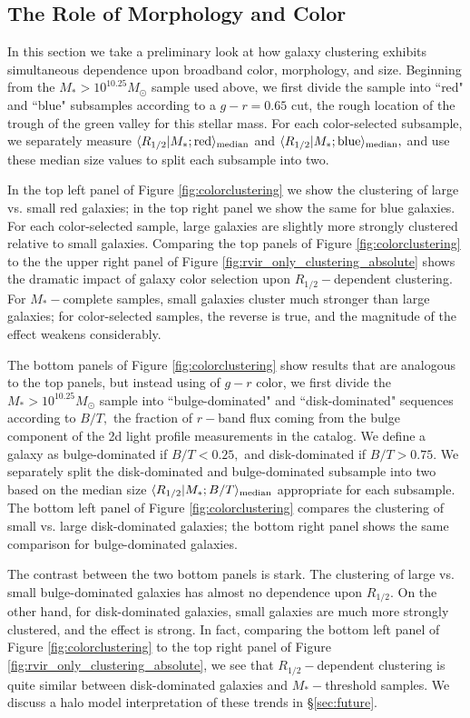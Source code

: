 \documentclass[usenatbib,usegraphicx,letterpaper]{mn2e}
\newcommand{\rhalf}{R_{1/2}}
\newcommand{\mstar}{M_{\ast}}
\newcommand{\median}[2]{\langle{#1}\vert{#2}\rangle_{\rm median}}
\newcommand{\msun}{M_\odot}
\begin{document}
\subsection{The Role of Morphology and Color}
\label{subsec:colormorph}

In this section we take a preliminary look at how galaxy clustering exhibits simultaneous dependence upon broadband color, morphology, and size. Beginning from the $\mstar>10^{10.25}\msun$ sample used above, we first divide the sample into ``red" and ``blue" subsamples according to a $g-r=0.65$ cut, the rough location of the trough of the green valley for this stellar mass. For each color-selected subsample, we separately measure $\median{\rhalf}{\mstar; {\rm red}}$ and $\median{\rhalf}{\mstar; {\rm blue}},$ and use these median size values to split each subsample into two.

In the top left panel of Figure \ref{fig:colorclustering} we show the clustering of large vs. small red galaxies; in the top right panel we show the same for blue galaxies. For each color-selected sample, large galaxies are slightly more strongly clustered relative to small galaxies. Comparing the top panels of Figure \ref{fig:colorclustering} to the the upper right panel of Figure \ref{fig:rvir_only_clustering_absolute} shows the dramatic impact of galaxy color selection upon $\rhalf-$dependent clustering. For $\mstar-$complete samples, small galaxies cluster much stronger than large galaxies; for color-selected samples, the reverse is true, and the magnitude of the effect weakens considerably.

The bottom panels of Figure \ref{fig:colorclustering} show results that are analogous to the top panels, but instead using of $g-r$ color, we first divide the $\mstar>10^{10.25}\msun$ sample into ``bulge-dominated" and ``disk-dominated" sequences according to $B/T,$ the fraction of $r-$band flux coming from the bulge component of the 2d light profile measurements in the \citet{meert_etal15} catalog. We define a galaxy as bulge-dominated if $B/T<0.25,$ and disk-dominated if $B/T>0.75.$ We separately split the disk-dominated and bulge-dominated subsample into two based on the median size $\median{\rhalf}{\mstar;B/T}$ appropriate for each subsample. The bottom left panel of Figure \ref{fig:colorclustering} compares the clustering of small vs. large disk-dominated galaxies; the bottom right panel shows the same comparison for bulge-dominated galaxies.

The contrast between the two bottom panels is stark. The clustering of large vs. small bulge-dominated galaxies has almost no dependence upon $\rhalf.$ On the other hand, for disk-dominated galaxies, small galaxies are much more strongly clustered, and the effect is strong. In fact, comparing the bottom left panel of Figure \ref{fig:colorclustering} to the top right panel of Figure \ref{fig:rvir_only_clustering_absolute}, we see that $\rhalf-$dependent clustering is quite similar between disk-dominated galaxies and $\mstar-$threshold samples. We discuss a halo model interpretation of these trends in \S\ref{sec:future}.
\end{document}
